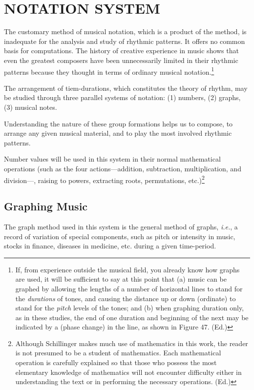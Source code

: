 
\chapter{NOTATION SYSTEM}

The customary method of musical notation, which is a product of the  method, is inadequate for the analysis and study of rhythmic patterns. It offers no common basis for computations. The history of creative experience in music shows that even the greatest composers have been unnecessarily limited in their rhythmic patterns because they thought in terms of ordinary musical notation.\footnote{If, from experience outside the musical field, you already know how graphs are used, it will be sufficient to say at this point that (a) music can be graphed by allowing the lengths of a number of horizontal lines to stand for the \textit{durations} of tones, and causing the distance up or down (ordinate) to stand for the \textit{pitch} levels of the tones; and (b) when graphing duration only, as in these studies, the end of one duration and beginning of the next may be indicated by a  (phase change) in the line, as shown in Figure 47. (Ed.)}

The arrangement of tiem-durations, which constitutes the theory of rhythm, may be studied through three parallel systems of notation: (1) numbers, (2) graphs, (3) musical notes.

Understanding the nature of these group formations helps us to compose, to arrange any given musical material, and to play the most involved rhythmic patterns.

Number values will be used in this system in their normal mathematical operations (such as the four actions---addition, subtraction, multiplication, and division---, raising to powers, extracting roots, permutations, etc.)\footnote{Although Schillinger makes much use of mathematics in this work, the reader is not presumed to be a student of mathematics. Each mathematical operation is carefully explained so that those who possess the most elementary knowledge of mathematics will not encounter difficulty either in understanding the text or in performing the necessary operations. (Ed.)}

\section{Graphing Music}

The graph method used in this system is the general method of graphs, \textit{i.e.}, a record of variation of special components, such as pitch or intensity in music, stocks in finance, diseases in medicine, etc. during a given time-period.
